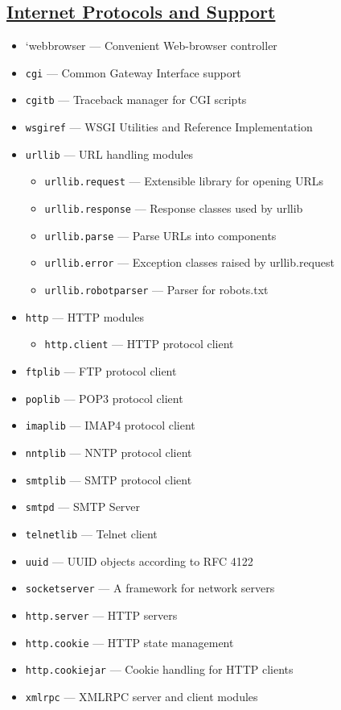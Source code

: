 \documentclass[]{book}
\providecommand{\tightlist}{%
  \setlength{\itemsep}{0pt}\setlength{\parskip}{0pt}}
\theoremstyle{definition}
\theoremstyle{definition}
\theoremstyle{definition}
\theoremstyle{remark}
\begin{document}
\subsection{\texorpdfstring{\href{https://docs.python.org/3.7/library/internet.html}{Internet
Protocols and
Support}}{Internet Protocols and Support}}\label{internet-protocols-and-support}

\begin{itemize}
\tightlist
\item
  `webbrowser --- Convenient Web-browser controller
\item
  \texttt{cgi} --- Common Gateway Interface support
\item
  \texttt{cgitb} --- Traceback manager for CGI scripts
\item
  \texttt{wsgiref} --- WSGI Utilities and Reference Implementation
\item
  \texttt{urllib} --- URL handling modules

  \begin{itemize}
  \tightlist
  \item
    \texttt{urllib.request} --- Extensible library for opening URLs
  \item
    \texttt{urllib.response} --- Response classes used by urllib
  \item
    \texttt{urllib.parse} --- Parse URLs into components
  \item
    \texttt{urllib.error} --- Exception classes raised by urllib.request
  \item
    \texttt{urllib.robotparser} --- Parser for robots.txt
  \end{itemize}
\item
  \texttt{http} --- HTTP modules

  \begin{itemize}
  \tightlist
  \item
    \texttt{http.client} --- HTTP protocol client
  \end{itemize}
\item
  \texttt{ftplib} --- FTP protocol client
\item
  \texttt{poplib} --- POP3 protocol client
\item
  \texttt{imaplib} --- IMAP4 protocol client
\item
  \texttt{nntplib} --- NNTP protocol client
\item
  \texttt{smtplib} --- SMTP protocol client
\item
  \texttt{smtpd} --- SMTP Server
\item
  \texttt{telnetlib} --- Telnet client
\item
  \texttt{uuid} --- UUID objects according to RFC 4122
\item
  \texttt{socketserver} --- A framework for network servers
\item
  \texttt{http.server} --- HTTP servers
\item
  \texttt{http.cookie} --- HTTP state management
\item
  \texttt{http.cookiejar} --- Cookie handling for HTTP clients
\item
  \texttt{xmlrpc} --- XMLRPC server and client modules


\end{itemize}
\end{document}
